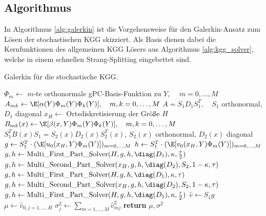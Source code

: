 \subsection{Algorithmus}
In Algorithmus \ref{alg:galerkin} ist die Vorgehensweise für den Galerkin-Ansatz zum Lösen der stochastischen KGG skizziert. Als Basis dienen dabei die Kernfunktionen des allgemeinen KGG Lösers aus Algorithmus \ref{alg:kgg_solver}, welche in einem schnellen Strang-Splitting eingebettet sind.
\begin{algorithm}[ht]
    \caption{Galerkin für die stochastische KGG.}
    \label{alg:galerkin}
    \begin{algorithmic}[1] %
            	\State $\Phi_m\gets$ $m$-te orthonormale gPC-Basis-Funktion zu $Y$, $\quad m=0,\dots,M$
              \State $A_{mk}\gets \E[\alpha(Y)\Phi_m(Y)\Phi_k(Y)],\quad m,k=0,\dots,M$
              \State $A=S_1D_1S_1^T, \quad S_1$ orthonormal, $D_1$ diagonal
              \State $x_H\gets$ Ortsdiskretisierung der Größe $H$
              	\State $B_{mk}(x)\gets \E[\beta(x,Y)\Phi_m(Y)\Phi_k(Y)],\quad m,k=0,\dots,M$
              	\State $S_1^TB(x)S_1=S_2(x)D_2(x)S_2^T(x)$, $S_2(x)$ orthonormal, $D_2(x)$ diagonal
              \EndFor
              \State
              \State $g\gets S_1^T\cdot (\E[u_0(x_H,Y)\Phi_m(Y)])_{m=0,\dots,M}$
              \State $h\gets S_1^T\cdot (\E[v_0(x_H,Y)\Phi_m(Y)])_{m=0,\dots,M}$
              \State $g,h\gets \text{Multi\_First\_Part\_Solver}(H, g, h, \diag(D_1), \kappa, \frac{\tau}{2})$
            \State $g,h\gets \text{Multi\_Second\_Part\_Solver}(x_H, g, h, \diag(D_2), S_2, 1-\kappa, \tau)$
              
            	\State $g,h\gets \text{Multi\_First\_Part\_Solver}(H, g, h, \diag(D_1), \kappa, \tau)$
            \State $g,h\gets \text{Multi\_Second\_Part\_Solver}(x_H, g, h, \diag(D_2), S_2, 1-\kappa, \tau)$
            \EndFor
            \State $g,h\gets \text{Multi\_First\_Part\_Solver}(H, g, h, \diag(D_1), \kappa, \frac{\tau}{2})$
            \State
            \State $\hat{v}\gets S_1g$  
            \State $\mu\gets \hat{v}_{0,j=1,\dots,H}$ 
			\State $\sigma^2_j\gets \sum_{m=1,\dots,M}\hat{v}^2_{mj}$
			\State \textbf{return} $\mu,\sigma^2$
        \EndFunction

\end{algorithmic}
\end{algorithm}

